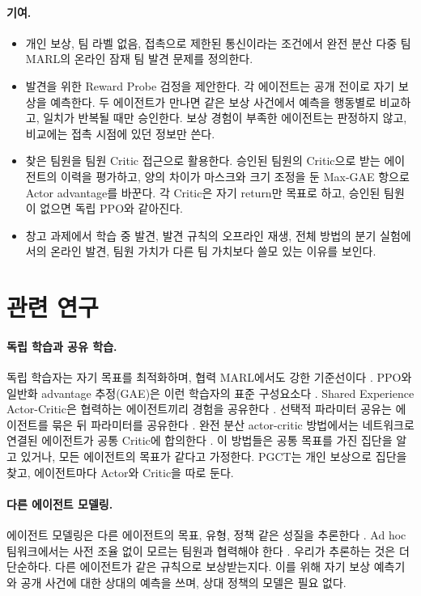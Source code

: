 \documentclass[10pt,twocolumn,letterpaper]{article}
\begin{document}
\paragraph{기여.}
\begin{itemize}\setlength\itemsep{1pt}
\item 개인 보상, 팀 라벨 없음, 접촉으로 제한된 통신이라는 조건에서 완전 분산 다중 팀 MARL의 온라인 잠재 팀 발견 문제를 정의한다.
\item 발견을 위한 Reward Probe 검정을 제안한다. 각 에이전트는 공개 전이로 자기 보상을 예측한다. 두 에이전트가 만나면 같은 보상 사건에서 예측을 행동별로 비교하고, 일치가 반복될 때만 승인한다. 보상 경험이 부족한 에이전트는 판정하지 않고, 비교에는 접촉 시점에 있던 정보만 쓴다.
\item 찾은 팀원을 팀원 Critic 접근으로 활용한다. 승인된 팀원의 Critic으로 받는 에이전트의 이력을 평가하고, 양의 차이가 마스크와 크기 조정을 둔 Max-GAE 항으로 Actor advantage를 바꾼다. 각 Critic은 자기 return만 목표로 하고, 승인된 팀원이 없으면 독립 PPO와 같아진다.
\item 창고 과제에서 학습 중 발견, 발견 규칙의 오프라인 재생, 전체 방법의 분기 실험에서의 온라인 발견, 팀원 가치가 다른 팀 가치보다 쓸모 있는 이유를 보인다.
\end{itemize}

\section{관련 연구}
\paragraph{독립 학습과 공유 학습.}
독립 학습자는 자기 목표를 최적화하며, 협력 MARL에서도 강한 기준선이다 \citep{tan,ippo,benchmark}. PPO와 일반화 advantage 추정(GAE)은 이런 학습자의 표준 구성요소다 \citep{ppo,gae,mappo}. Shared Experience Actor-Critic은 협력하는 에이전트끼리 경험을 공유한다 \citep{seac}. 선택적 파라미터 공유는 에이전트를 묶은 뒤 파라미터를 공유한다 \citep{seps}. 완전 분산 actor-critic 방법에서는 네트워크로 연결된 에이전트가 공통 Critic에 합의한다 \citep{fdmarl}. 이 방법들은 공통 목표를 가진 집단을 알고 있거나, 모든 에이전트의 목표가 같다고 가정한다. PGCT는 개인 보상으로 집단을 찾고, 에이전트마다 Actor와 Critic을 따로 둔다.

\paragraph{다른 에이전트 모델링.}
에이전트 모델링은 다른 에이전트의 목표, 유형, 정책 같은 성질을 추론한다 \citep{modelling}. Ad hoc 팀워크에서는 사전 조율 없이 모르는 팀원과 협력해야 한다 \citep{adhoc}. 우리가 추론하는 것은 더 단순하다. 다른 에이전트가 같은 규칙으로 보상받는지다. 이를 위해 자기 보상 예측기와 공개 사건에 대한 상대의 예측을 쓰며, 상대 정책의 모델은 필요 없다.
\end{document}
